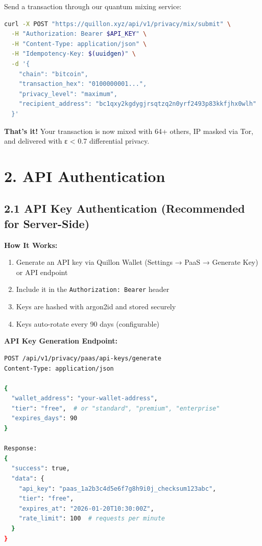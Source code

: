 \documentclass[11pt,a4paper]{article}
\begin{document}
Send a transaction through our quantum mixing service:

\begin{lstlisting}[language=bash]
curl -X POST "https://quillon.xyz/api/v1/privacy/mix/submit" \
  -H "Authorization: Bearer $API_KEY" \
  -H "Content-Type: application/json" \
  -H "Idempotency-Key: $(uuidgen)" \
  -d '{
    "chain": "bitcoin",
    "transaction_hex": "0100000001...",
    "privacy_level": "maximum",
    "recipient_address": "bc1qxy2kgdygjrsqtzq2n0yrf2493p83kkfjhx0wlh"
  }'
\end{lstlisting}

\textbf{That's it!} Your transaction is now mixed with 64+ others, IP masked via Tor, and delivered with ε < 0.7 differential privacy.

\section{2. API Authentication}

\subsection{2.1 API Key Authentication (Recommended for Server-Side)}

\textbf{How It Works:}
\begin{enumerate}
    \item Generate an API key via Quillon Wallet (Settings → PaaS → Generate Key) or API endpoint
    \item Include it in the \texttt{Authorization: Bearer} header
    \item Keys are hashed with argon2id and stored securely
    \item Keys auto-rotate every 90 days (configurable)
\end{enumerate}

\textbf{API Key Generation Endpoint:}
\begin{lstlisting}[language=bash]
POST /api/v1/privacy/paas/api-keys/generate
Content-Type: application/json

{
  "wallet_address": "your-wallet-address",
  "tier": "free",  # or "standard", "premium", "enterprise"
  "expires_days": 90
}

Response:
{
  "success": true,
  "data": {
    "api_key": "paas_1a2b3c4d5e6f7g8h9i0j_checksum123abc",
    "tier": "free",
    "expires_at": "2026-01-20T10:30:00Z",
    "rate_limit": 100  # requests per minute
  }
}
\end{lstlisting}
\end{document}
